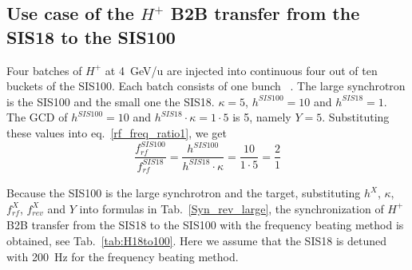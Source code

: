 %
%
\subsection{Use case of the $H^{+}$ B2B transfer from the SIS18 to the SIS100}
Four batches of $H^{+}$ at \SI{4}{GeV/\atomicmassunit} are injected into continuous four out of ten buckets of the SIS100. Each batch consists of one bunch ~\cite{liebermann_fair_2013, liebermann_sis100_2013}. The large synchrotron is the SIS100 and the small one the SIS18. $\kappa=5$, $h^{\mathit{SIS100}}=10$ and $h^{\mathit{SIS18}}=1$. The GCD of $h^{\mathit{SIS100}}=10$ and $h^{\mathit{SIS18}} \cdot \kappa=1\cdot 5$ is 5, namely $Y=5$. Substituting these values into eq.~\ref{rf_freq_ratio1}, we get
\begin{equation}
\frac{f_{\mathit{rf}}^{\mathit{SIS100}}}{f_{\mathit{rf}}^{\mathit{SIS18}}}= \frac {h^{\mathit{SIS100}}}{h^{\mathit{SIS18}} \cdot \kappa}= \frac{10}{1 \cdot 5}=\frac{2}{1}
\end{equation}

Because the SIS100 is the large synchrotron and the target, substituting $h^X$, $\kappa$, $f_{\mathit{rf}}^{X}$, $f_{\mathit{rev}}^{X}$ and $Y$ into formulas in Tab.~\ref{Syn_rev_large}, the synchronization of $H^{+}$ B2B transfer from the SIS18 to the SIS100 with the frequency beating method is obtained, see Tab.~\ref{tab:H18to100}. Here we assume that the SIS18 is detuned with \SI{200}{Hz} for the frequency beating method. 

